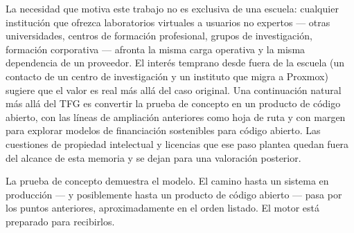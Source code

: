 La necesidad que motiva este trabajo no es exclusiva de una escuela:
cualquier institución que ofrezca laboratorios virtuales a usuarios no
expertos --- otras universidades, centros de formación profesional,
grupos de investigación, formación corporativa --- afronta la misma
carga operativa y la misma dependencia de un proveedor. El interés
temprano desde fuera de la escuela (un contacto de un centro de
investigación y un instituto que migra a Proxmox) sugiere que el valor
es real más allá del caso original. Una continuación natural más allá
del TFG es convertir la prueba de concepto en un producto de código
abierto, con las líneas de ampliación anteriores como hoja de ruta y
con margen para explorar modelos de financiación sostenibles para
código abierto. Las cuestiones de propiedad intelectual y licencias
que ese paso plantea quedan fuera del alcance de esta memoria y se
dejan para una valoración posterior.


La prueba de concepto demuestra el modelo. El camino hasta un
sistema en producción --- y posiblemente hasta un producto de código
abierto --- pasa por los puntos anteriores, aproximadamente en el
orden listado. El motor está preparado para recibirlos.

